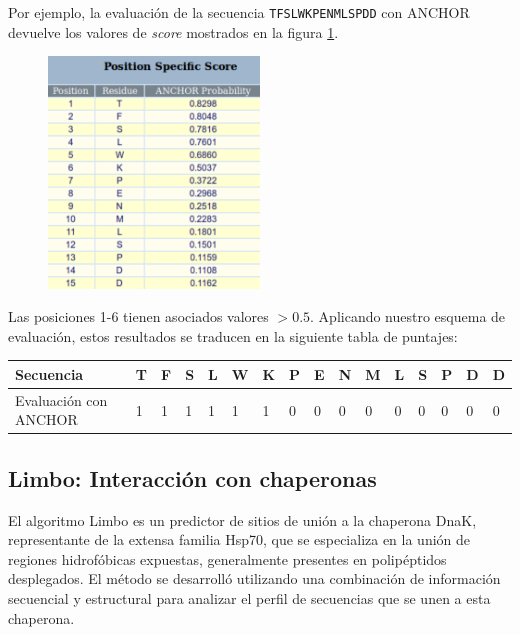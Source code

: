 Por ejemplo, la evaluación de la secuencia \texttt{TFSLWKPENMLSPDD} con ANCHOR devuelve los valores de \textit{score} mostrados en la figura \ref{anchorResults}. 

\begin{figure}[ht]
\centering
\includegraphics[width=0.5\textwidth]{img/anchorTabla.png} 
\caption{}
\label{anchorResults}
\end{figure}

Las posiciones 1-6 tienen asociados valores $>0.5$. Aplicando nuestro esquema de evaluación, estos resultados se traducen en la siguiente tabla de puntajes:

\vspace{0.5cm}
\noindent
\begin{tabular}{llllllllllllllll} 
\hline      
Secuencia & \textbf{T} & \textbf{F} & \textbf{S} & \textbf{L} & \textbf{W} & \textbf{K} & \textbf{P} & \textbf{E} & \textbf{N} & \textbf{M} & \textbf{L} & \textbf{S} & \textbf{P} & \textbf{D} & \textbf{D} \\ \hline
Evaluación con ANCHOR & 1 & 1 & 1 & 1 & 1 & 1 & 0 & 0 & 0 & 0 & 0 & 0 & 0 & 0 & 0\\ \hline
\end{tabular}





\subsection{Limbo: Interacción con chaperonas} \label{limbo}

El algoritmo Limbo\cite{van2009accurate} es un predictor de sitios de unión a la chaperona DnaK, representante de la extensa familia Hsp70, que se especializa en la unión de regiones hidrofóbicas expuestas, generalmente
presentes en polipéptidos desplegados. El método se desarrolló utilizando una combinación de información secuencial y estructural para analizar el perfil de secuencias que se unen a esta chaperona.

